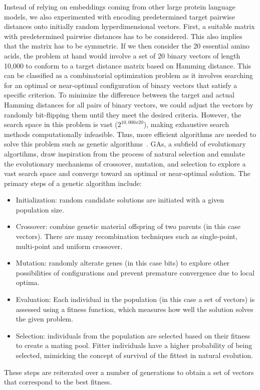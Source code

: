 Instead of relying on embeddings coming from other large protein language models, we also experimented with encoding predetermined target pairwise distances onto initially random hyperdimensional vectors. First, a suitable matrix with predetermined pairwise distances has to be considered. This also implies that the matrix has to be symmetric. If we then consider the 20 essential amino acids, the problem at hand would involve a set of 20 binary vectors of length 10,000 to conform to a target distance matrix based on Hamming distance. This can be classified as a combinatorial optimization problem as it involves searching for an optimal or near-optimal configuration of binary vectors that satisfy a specific criterion. To minimize the difference between the target and actual Hamming distances for all pairs of binary vectors, we could adjust the vectors by randomly bit-flipping them until they meet the desired criteria. However, the search space in this problem is vast ($2^{10,000 x 20}$), making exhaustive search methods computationally infeasible. Thus, more efficient algorithms are needed to solve this problem such as genetic algorithms~\cite{GA}. GAs, a subfield of evolutionary algortihms, draw inspiration from the process of natural selection and emulate the evolutionary mechanisms of crossover, mutation, and selection to explore a vast search space and converge toward an optimal or near-optimal solution. The primary steps of a genetic algorithm include:
\begin{itemize}
    \item Initialization: random candidate solutions are initiated with a given population size.
    \item Crossover: combine genetic material offspring of two parents (in this case vectors). There are many recombination techniques such as single-point, multi-point and uniform crossover.
    \item Mutation: randomly alterate genes (in this case bits) to explore other possibilities of configurations and prevent premature convergence due to local optima.
    \item Evaluation: Each individual in the population (in this case a set of vectors) is assessed using a fitness function, which measures how well the solution solves the given problem.
    \item Selection: individuals from the population are selected based on their fitness to create a mating pool. Fitter individuals have a higher probability of being selected, mimicking the concept of survival of the fittest in natural evolution.
\end{itemize}
These steps are reiterated over a number of generations to obtain a set of vectors that correspond to the best fitness.

